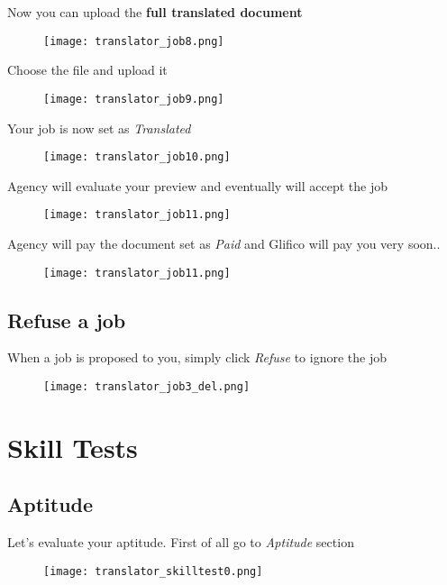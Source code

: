 \documentclass[11 pt, a4paper]{article}
\begin{document}
\clearpage
Now you can upload the \textbf{full translated document}
\begin{figure}[H]
\centering
\texttt{[image: translator\_job8.png]}
\end{figure}

Choose the file and upload it
\begin{figure}[H]
\centering
\texttt{[image: translator\_job9.png]}
\end{figure}


\clearpage
Your job is now set as \textit{Translated}
\begin{figure}[H]
\centering
\texttt{[image: translator\_job10.png]}
\end{figure}

Agency will evaluate your preview and eventually will accept the job
\begin{figure}[H]
\centering
\texttt{[image: translator\_job11.png]}
\end{figure}

\clearpage
Agency will pay the document set as \textit{Paid} and Glifico will pay you very soon..
\begin{figure}[H]
\centering
\texttt{[image: translator\_job11.png]}
\end{figure}

\clearpage
\subsection{Refuse a job}
When a job is proposed to you, simply click \textit{Refuse} to ignore the job
\begin{figure}[H]
\centering
\texttt{[image: translator\_job3\_del.png]}
\end{figure}


\clearpage
\section{Skill Tests}
\subsection{Aptitude}
Let's evaluate your aptitude. First of all go to \textit{Aptitude} section
\begin{figure}[H]
\centering
\texttt{[image: translator\_skilltest0.png]}
\end{figure}
\end{document}
